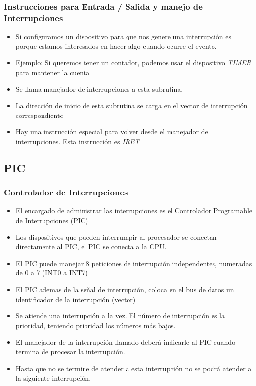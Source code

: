 \documentclass{beamer}
\begin{document}
\begin{frame}
\frametitle{Instrucciones para Entrada / Salida y manejo de Interrupciones}

\begin{itemize}

 \item Si configuramos un dispositivo para que nos genere una interrupción es porque estamos interesados en hacer algo cuando ocurre el evento.
 \item Ejemplo: Si queremos tener un contador, podemos usar el dispositivo \emph{TIMER} para mantener la cuenta
 \item Se llama manejador de interrupciones a esta subrutina.
 \item La dirección de inicio de esta subrutina se carga en el vector de interrupción correspondiente
 \item Hay una instrucción especial para volver desde el manejador de interrupciones. Esta instrucción es \emph{IRET}
\end{itemize}

\end{frame}


\subsection{PIC}
\begin{frame}
\frametitle{Controlador de Interrupciones}

\begin{itemize}
 \item El encargado de administrar las interrupciones es el Controlador Programable de Interrupciones (PIC)
 \item Los dispositivos que pueden interrumpir al procesador se conectan directamente al PIC, el PIC se conecta a la CPU.
 \item El PIC puede manejar 8 peticiones de interrupción independentes, numeradas de 0 a 7 (INT0 a INT7)
 \item El PIC ademas de la señal de interrupción, coloca en el bus de datos un identificador de la interrupción (vector)
 \item Se atiende una interrupción a la vez. El número de interrupción es la prioridad, teniendo prioridad los números más bajos.
 \item El manejador de la interrupción llamado deberá indicarle al PIC cuando termina de procesar la interrupción. 
 \item Hasta que no se termine de atender a esta interrupción no se podrá atender a la siguiente interrupción.
\end{itemize}
\end{frame}
\end{document}
